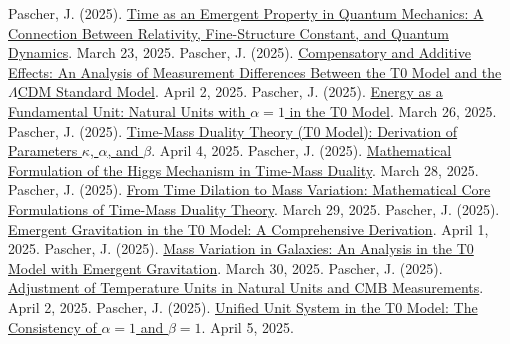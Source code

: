 \documentclass[12pt,a4paper]{article}
\begin{document}
	\begin{thebibliography}{99}
		 Pascher, J. (2025). \href{https://github.com/jpascher/T0-Time-Mass-Duality/tree/main/2/pdf/English/ZeitEmergentQMEn.pdf}{Time as an Emergent Property in Quantum Mechanics: A Connection Between Relativity, Fine-Structure Constant, and Quantum Dynamics}. March 23, 2025.
		 Pascher, J. (2025). \href{https://github.com/jpascher/T0-Time-Mass-Duality/tree/main/2/pdf/English/MessdifferenzenT0StandardEn.pdf}{Compensatory and Additive Effects: An Analysis of Measurement Differences Between the T0 Model and the \(\Lambda\)CDM Standard Model}. April 2, 2025.
		 Pascher, J. (2025). \href{https://github.com/jpascher/T0-Time-Mass-Duality/tree/main/2/pdf/English/NatEinheitenAlpha1En.pdf}{Energy as a Fundamental Unit: Natural Units with \(\alpha = 1\) in the T0 Model}. March 26, 2025.
		 Pascher, J. (2025). \href{https://github.com/jpascher/T0-Time-Mass-Duality/tree/main/2/pdf/English/ZeitMasseT0ParamsEn.pdf}{Time-Mass Duality Theory (T0 Model): Derivation of Parameters \(\kappa\), \(\alpha\), and \(\beta\)}. April 4, 2025.
		 Pascher, J. (2025). \href{https://github.com/jpascher/T0-Time-Mass-Duality/tree/main/2/pdf/English/MathHiggsZeitMasseEn.pdf}{Mathematical Formulation of the Higgs Mechanism in Time-Mass Duality}. March 28, 2025.
		 Pascher, J. (2025). \href{https://github.com/jpascher/T0-Time-Mass-Duality/tree/main/2/pdf/English/MathZeitMasseLagrangeEn.pdf}{From Time Dilation to Mass Variation: Mathematical Core Formulations of Time-Mass Duality Theory}. March 29, 2025.
		 Pascher, J. (2025). \href{https://github.com/jpascher/T0-Time-Mass-Duality/tree/main/2/pdf/English/EmergentGravT0En.pdf}{Emergent Gravitation in the T0 Model: A Comprehensive Derivation}. April 1, 2025.
		 Pascher, J. (2025). \href{https://github.com/jpascher/T0-Time-Mass-Duality/tree/main/2/pdf/English/MassVarGalaxienEn.pdf}{Mass Variation in Galaxies: An Analysis in the T0 Model with Emergent Gravitation}. March 30, 2025.
		 Pascher, J. (2025). \href{https://github.com/jpascher/T0-Time-Mass-Duality/tree/main/2/pdf/English/NatEinheitenAlpha1En.pdf}{Adjustment of Temperature Units in Natural Units and CMB Measurements}. April 2, 2025.
		 Pascher, J. (2025). \href{https://github.com/jpascher/T0-Time-Mass-Duality/tree/main/2/pdf/English/Alpha1Beta1KonsistenzEn.pdf}{Unified Unit System in the T0 Model: The Consistency of \(\alpha = 1\) and \(\beta = 1\)}. April 5, 2025.

\end{thebibliography}
\end{document}
